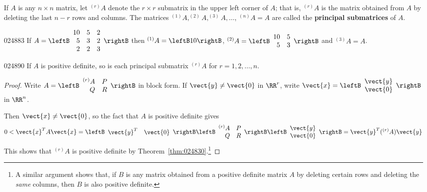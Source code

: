 If $A$ is any $n \times n$ matrix, let $^{(r)}A$ denote the $r \times r$ submatrix in the upper left corner of $A$; that is, $^{(r)}A$ is the matrix obtained from $A$ by deleting the last $n - r$ rows and columns. The matrices $^{(1)}A, ^{(2)}A, ^{(3)}A, \dots$, $^{(n)}A = A$ are called the \textbf{principal submatrices} of $A$.


\begin{example}{}{024883}
If $A = \leftB \begin{array}{rrr}
10 & 5 & 2 \\
5 & 3 & 2 \\
2 & 2 & 3
\end{array}\rightB$ then $^{(1)}A = \leftB 10 \rightB$, $^{(2)}A = \leftB \begin{array}{rr}
10 & 5 \\
5 & 3
\end{array}\rightB$ and $^{(3)}A = A$.
\end{example}

\begin{lemma}{}{024890}
If $A$ is positive definite, so is each principal submatrix $^{(r)}A$ for $r = 1, 2, \dots, n$.
\end{lemma}

\begin{proof}
Write $A = \leftB \begin{array}{rr}
^{(r)}A & P \\
Q & R
\end{array}\rightB$
 in block form. If $\vect{y} \neq \vect{0}$ in $\RR^r$, write $\vect{x} = \leftB \begin{array}{r}
 \vect{y} \\
 \vect{0}
 \end{array}\rightB$ in $\RR^n$.

Then $\vect{x} \neq \vect{0}$, so the fact that $A$ is positive definite gives
\begin{equation*}
0 < \vect{x}^TA\vect{x} = \leftB \begin{array}{rr}
\vect{y}^T & \vect{0}
\end{array}\rightB \leftB \begin{array}{rr}
^{(r)}A & P \\
Q & R
\end{array}\rightB \leftB \begin{array}{r}
\vect{y} \\
\vect{0}
\end{array}\rightB = \vect{y}^T(^{(r)}A)\vect{y}
\end{equation*}
This shows that $^{(r)}A$ is positive definite by Theorem~\ref{thm:024830}.\footnote{A similar argument shows that, if $B$ is any matrix obtained from a positive definite matrix $A$ by deleting certain rows and deleting the \textit{same} columns, then $B$ is also positive definite.}
\end{proof}

